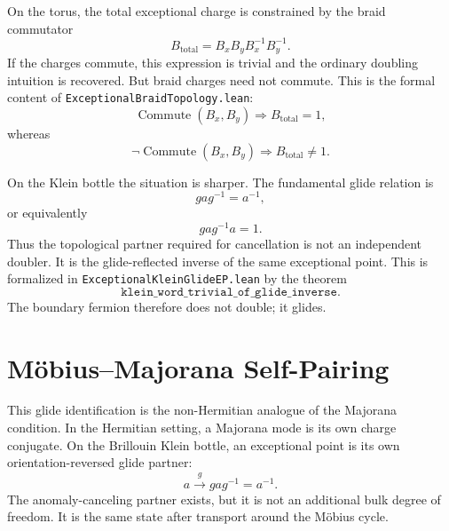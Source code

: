 On the torus, the total exceptional charge is constrained by the braid commutator
\begin{equation}
    B_{\mathrm{total}}=B_xB_yB_x^{-1}B_y^{-1}.
\end{equation}
If the charges commute, this expression is trivial and the ordinary doubling intuition is recovered.  But braid charges need not commute.  This is the formal content of \texttt{ExceptionalBraidTopology.lean}:
\begin{equation}
    \operatorname{Commute}(B_x,B_y)
    \Rightarrow
    B_{\mathrm{total}}=1,
\end{equation}
whereas
\begin{equation}
    \neg\operatorname{Commute}(B_x,B_y)
    \Rightarrow
    B_{\mathrm{total}}\neq1.
\end{equation}

On the Klein bottle the situation is sharper.  The fundamental glide relation is
\begin{equation}
    g a g^{-1}=a^{-1},
\end{equation}
or equivalently
\begin{equation}
    g a g^{-1}a=1.
\end{equation}
Thus the topological partner required for cancellation is not an independent doubler.  It is the glide-reflected inverse of the same exceptional point.  This is formalized in \texttt{ExceptionalKleinGlideEP.lean} by the theorem
\begin{equation}
    \texttt{klein\_word\_trivial\_of\_glide\_inverse}.
\end{equation}
The boundary fermion therefore does not double; it glides.

\section{Möbius--Majorana Self-Pairing}

This glide identification is the non-Hermitian analogue of the Majorana condition.  In the Hermitian setting, a Majorana mode is its own charge conjugate.  On the Brillouin Klein bottle, an exceptional point is its own orientation-reversed glide partner:
\begin{equation}
    a\xrightarrow{\;g\;}gag^{-1}=a^{-1}.
\end{equation}
The anomaly-canceling partner exists, but it is not an additional bulk degree of freedom.  It is the same state after transport around the Möbius cycle.

